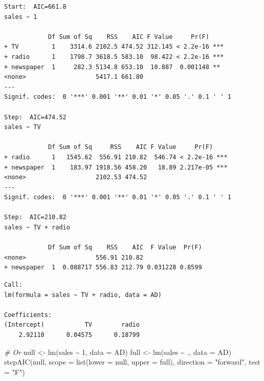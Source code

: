 \documentclass[
]{article}
\newenvironment{Shaded}{\begin{snugshade}}{\end{snugshade}}
\newcommand{\AttributeTok}[1]{\textcolor[rgb]{0.77,0.63,0.00}{#1}}
\newcommand{\CommentTok}[1]{\textcolor[rgb]{0.56,0.35,0.01}{\textit{#1}}}
\newcommand{\DecValTok}[1]{\textcolor[rgb]{0.00,0.00,0.81}{#1}}
\newcommand{\FunctionTok}[1]{\textcolor[rgb]{0.00,0.00,0.00}{#1}}
\newcommand{\NormalTok}[1]{#1}
\newcommand{\OtherTok}[1]{\textcolor[rgb]{0.56,0.35,0.01}{#1}}
\newcommand{\SpecialCharTok}[1]{\textcolor[rgb]{0.00,0.00,0.00}{#1}}
\newcommand{\StringTok}[1]{\textcolor[rgb]{0.31,0.60,0.02}{#1}}
\begin{document}
\begin{verbatim}
Start:  AIC=661.8
sales ~ 1

            Df Sum of Sq    RSS    AIC F Value     Pr(F)    
+ TV         1    3314.6 2102.5 474.52 312.145 < 2.2e-16 ***
+ radio      1    1798.7 3618.5 583.10  98.422 < 2.2e-16 ***
+ newspaper  1     282.3 5134.8 653.10  10.887  0.001148 ** 
<none>                   5417.1 661.80                      
---
Signif. codes:  0 '***' 0.001 '**' 0.01 '*' 0.05 '.' 0.1 ' ' 1

Step:  AIC=474.52
sales ~ TV

            Df Sum of Sq     RSS    AIC F Value     Pr(F)    
+ radio      1   1545.62  556.91 210.82  546.74 < 2.2e-16 ***
+ newspaper  1    183.97 1918.56 458.20   18.89 2.217e-05 ***
<none>                   2102.53 474.52                      
---
Signif. codes:  0 '***' 0.001 '**' 0.01 '*' 0.05 '.' 0.1 ' ' 1

Step:  AIC=210.82
sales ~ TV + radio

            Df Sum of Sq    RSS    AIC  F Value  Pr(F)
<none>                   556.91 210.82                
+ newspaper  1  0.088717 556.83 212.79 0.031228 0.8599
\end{verbatim}

\begin{verbatim}
Call:
lm(formula = sales ~ TV + radio, data = AD)

Coefficients:
(Intercept)           TV        radio  
    2.92110      0.04575      0.18799  
\end{verbatim}

\begin{Shaded}
\begin{Highlighting}[]
\CommentTok{\# Or}
\NormalTok{null }\OtherTok{\textless{}{-}} \FunctionTok{lm}\NormalTok{(sales }\SpecialCharTok{\textasciitilde{}} \DecValTok{1}\NormalTok{, }\AttributeTok{data =}\NormalTok{ AD)}
\NormalTok{full }\OtherTok{\textless{}{-}} \FunctionTok{lm}\NormalTok{(sales }\SpecialCharTok{\textasciitilde{}}\NormalTok{ ., }\AttributeTok{data =}\NormalTok{ AD)}
\FunctionTok{stepAIC}\NormalTok{(null, }\AttributeTok{scope =} \FunctionTok{list}\NormalTok{(}\AttributeTok{lower =}\NormalTok{ null, }\AttributeTok{upper =}\NormalTok{ full), }\AttributeTok{direction =} \StringTok{"forward"}\NormalTok{, }\AttributeTok{test =} \StringTok{"F"}\NormalTok{)}
\end{Highlighting}
\end{Shaded}
\end{document}
